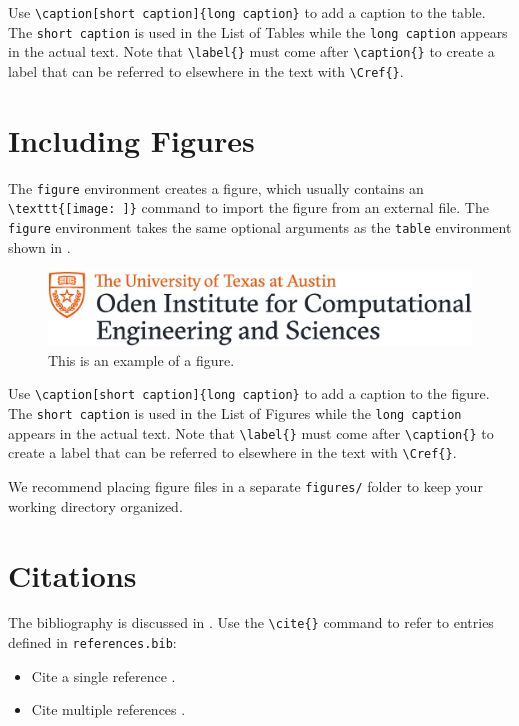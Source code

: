 Use \verb"\caption[short caption]{long caption}" to add a caption to the table.
The \texttt{short caption} is used in the List of Tables
%
while the \texttt{long caption} appears in the actual text.
Note that \verb"\label{}" must come after \verb"\caption{}" to create a label that can be referred to elsewhere in the text with \verb"\Cref{}".

\section{Including Figures} %

The \verb"figure" environment
creates a figure, which usually contains an \verb"\texttt{[image: ]}" command to import the figure from an external file.
The \verb"figure" environment takes the same optional arguments as the \verb"table" environment shown in .

\begin{figure}[th]
    \centering
    \includegraphics[width=.7\textwidth]{figures/oden.pdf}
    \caption[An example figure.]{This is an example of a figure.}
    \label{figure:example}
\end{figure}

Use \verb"\caption[short caption]{long caption}" to add a caption to the figure.
The \texttt{short caption} is used in the List of Figures
%
while the \texttt{long caption} appears in the actual text.
Note that \verb"\label{}" must come after \verb"\caption{}" to create a label that can be referred to elsewhere in the text with \verb"\Cref{}".

We recommend placing figure files in a separate \verb"figures/" folder to keep your working directory organized.


\section{Citations} %

The bibliography is discussed in .
Use the \verb"\cite{}" command to refer to entries defined in \texttt{references.bib}:
\begin{itemize}
    \item Cite a single reference \cite{knuth1984texbook}.
    \item Cite multiple references \cite{lamport1994latex, goosens1994latex}.
\end{itemize}
